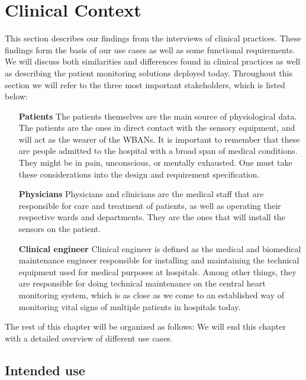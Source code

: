 \section{Clinical Context} %
\label{sec:clinical_context}

This section describes our findings from the interviews of clinical practices. These findings form the basis of our use cases as well as some functional requirements. We will discuss both similarities and differences found in clinical practices as well as describing the patient monitoring solutions deployed today. Throughout this section we will refer to the three most important stakeholders, which is listed below:

\begin{itemize}

  \item[\textbf{Patients}] The patients themselves are the main source of physiological data. The patients are the ones in direct contact with the sensory equipment, and will act as the wearer of the  WBANs. It is important to remember that these are people admitted to the hospital with a broad span of medical conditions. They might be in pain, unconscious, or mentally exhausted. One must take these considerations into the design and requirement specification.

  \item[\textbf{Physicians}] Physicians and clinicians are the medical staff that are responsible for care and treatment of patients, as well as operating their respective wards and departments. They are the ones that will install the sensors on the patient.

  \item[\textbf{Clinical engineer}] Clinical engineer is defined as the medical and biomedical maintenance engineer responsible for installing and maintaining the technical equipment used for medical purposes at hospitals. Among other things, they are responsible for doing technical maintenance  on the central heart monitoring system, which is as close as we come to an established way of monitoring vital signs of multiple patients in hospitals today.

\end{itemize}

The rest of this chapter will be organized as follows: 
We will end this chapter with a detailed overview of different use cases.

\subsection{Intended use} %
\label{sub:intended_use}

